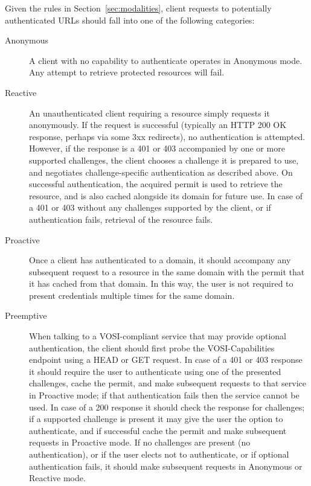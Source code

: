 \documentclass[11pt,a4paper]{ivoa}
\begin{document}
Given the rules in Section~\ref{sec:modalities},
client requests to potentially authenticated URLs should
fall into one of the following categories:
\begin{description}
\item[Anonymous]
      A client with no capability to authenticate operates in Anonymous mode.
      Any attempt to retrieve protected resources will fail.
\item[Reactive]
      An unauthenticated client requiring a
      resource simply requests it anonymously.
      If the request is successful
      (typically an HTTP 200 OK response, perhaps via some 3xx redirects),
      no authentication is attempted.
      However, if the response is a 401 or 403 accompanied by
      one or more supported challenges,
      the client chooses a challenge it is prepared to use,
      and negotiates challenge-specific authentication as described above.
      On successful authentication, the acquired permit is used to
      retrieve the resource, and is also cached alongside its domain
      for future use.
      In case of a 401 or 403 without any challenges supported by the client,
      or if authentication fails, retrieval of the resource fails.
\item[Proactive]
      Once a client has authenticated to a domain,
      it should accompany any subsequent request to a resource
      in the same domain
      with the permit that it has cached from that domain.
      In this way, the user is not required to present credentials
      multiple times for the same domain.
\item[Preemptive]
      When talking to a VOSI-compliant service that may provide
      optional authentication,
      the client should first probe the VOSI-Capabilities endpoint
      using a HEAD or GET request.
      In case of a 401 or 403 response
      it should require the user to authenticate
      using one of the presented challenges,
      cache the permit, and make subsequent requests
      to that service in Proactive mode;
      if that authentication fails then the service cannot be used.
      In case of a 200 response it should check the response for challenges;
      if a supported challenge is present it may give the user the
      option to authenticate, and if successful cache the permit and
      make subsequent requests in Proactive mode.
      If no challenges are present (no authentication),
      or if the user elects not to authenticate,
      or if optional authentication fails,
      it should make subsequent requests in Anonymous or Reactive mode.
\end{description}
\end{document}
